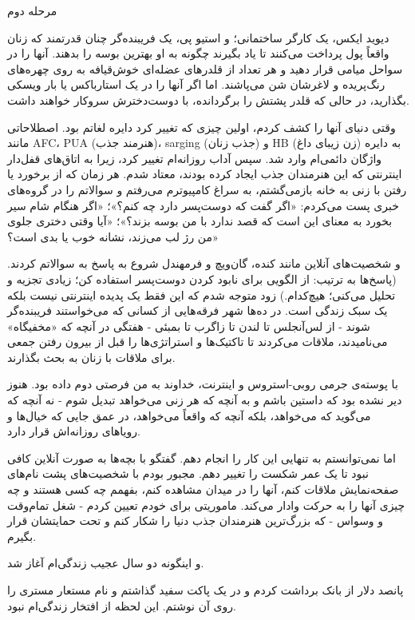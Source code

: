 مرحله دوم

دیوید ایکس، یک کارگر ساختمانی؛ و استیو پی، یک فریبنده‌گر چنان قدرتمند که زنان واقعاً پول پرداخت می‌کنند تا یاد بگیرند چگونه به او بهترین بوسه را بدهند. آنها را در سواحل میامی قرار دهید و هر تعداد از قلدرهای عضله‌ای خوش‌قیافه به روی چهره‌های رنگ‌پریده و لاغرشان شن می‌پاشند. اما اگر آنها را در یک استارباکس یا بار ویسکی بگذارید، در حالی که قلدر پشتش را برگردانده، با دوست‌دخترش سروکار خواهند داشت.

وقتی دنیای آنها را کشف کردم، اولین چیزی که تغییر کرد دایره لغاتم بود. اصطلاحاتی مانند AFC، PUA (هنرمند جذب)، sarging (جذب زنان) و HB (زن زیبای داغ) به دایره واژگان دائمی‌ام وارد شد. سپس آداب روزانه‌ام تغییر کرد، زیرا به اتاق‌های قفل‌دار اینترنتی که این هنرمندان جذب ایجاد کرده بودند، معتاد شدم. هر زمان که از برخورد یا رفتن با زنی به خانه بازمی‌گشتم، به سراغ کامپیوترم می‌رفتم و سوالاتم را در گروه‌های خبری پست می‌کردم: «اگر گفت که دوست‌پسر دارد چه کنم؟»؛ «اگر هنگام شام سیر بخورد به معنای این است که قصد ندارد با من بوسه بزند؟»؛ «آیا وقتی دختری جلوی من رژ لب می‌زند، نشانه خوب یا بدی است؟»

و شخصیت‌های آنلاین مانند کنده، گان‌ویچ و فرمهندل شروع به پاسخ به سوالاتم کردند. (پاسخ‌ها به ترتیب: از الگویی برای نابود کردن دوست‌پسر استفاده کن؛ زیادی تجزیه و تحلیل می‌کنی؛ هیچ‌کدام.) زود متوجه شدم که این فقط یک پدیده اینترنتی نیست بلکه یک سبک زندگی است. در ده‌ها شهر فرقه‌هایی از کسانی که می‌خواستند فریبنده‌گر شوند - از لس‌آنجلس تا لندن تا زاگرب تا بمبئی - هفتگی در آنچه که «مخفیگاه» می‌نامیدند، ملاقات می‌کردند تا تاکتیک‌ها و استراتژی‌ها را قبل از بیرون رفتن جمعی برای ملاقات با زنان به بحث بگذارند.

با پوسته‌ی جرمی روبی-استروس و اینترنت، خداوند به من فرصتی دوم داده بود. هنوز دیر نشده بود که داستین باشم و به آنچه که هر زنی می‌خواهد تبدیل شوم - نه آنچه که می‌گوید که می‌خواهد، بلکه آنچه که واقعاً می‌خواهد، در عمق جایی که خیال‌ها و رویاهای روزانه‌اش قرار دارد.

اما نمی‌توانستم به تنهایی این کار را انجام دهم. گفتگو با بچه‌ها به صورت آنلاین کافی نبود تا یک عمر شکست را تغییر دهم. مجبور بودم با شخصیت‌های پشت نام‌های صفحه‌نمایش ملاقات کنم، آنها را در میدان مشاهده کنم، بفهمم چه کسی هستند و چه چیزی آنها را به حرکت وادار می‌کند. ماموریتی برای خودم تعیین کردم - شغل تمام‌وقت و وسواس - که بزرگ‌ترین هنرمندان جذب دنیا را شکار کنم و تحت حمایتشان قرار بگیرم.

و اینگونه دو سال عجیب زندگی‌ام آغاز شد.

پانصد دلار از بانک برداشت کردم و در یک پاکت سفید گذاشتم و نام مستعار مستری را روی آن نوشتم. این لحظه از افتخار زندگی‌ام نبود.

